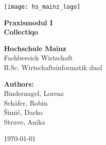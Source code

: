 \begin{titlepage}
    \centering
    \vspace*{1cm}

    \texttt{[image: hs\_mainz\_logo]}\\
    \vspace{1.5cm}

    \textbf{\LARGE Praxismodul I}\\
    \vspace{0.5cm}
    \textbf{\Large Collectiqo}\\
    \vspace{1.5cm}

    \textbf{Hochschule Mainz}\\
    \vspace{0.5cm}
    Fachbereich Wirtschaft\\
    \vspace{0.5cm}
    B.Sc. Wirtschaftsinformatik dual\\
    \vspace{1.5cm}

    \textbf{Authors:}\\
    Bindernagel, Lorenz\\
    Schäfer, Robin\\
    Šimić, Darko\\
    Struve, Anika\\
    \vfill

    \today
\end{titlepage}